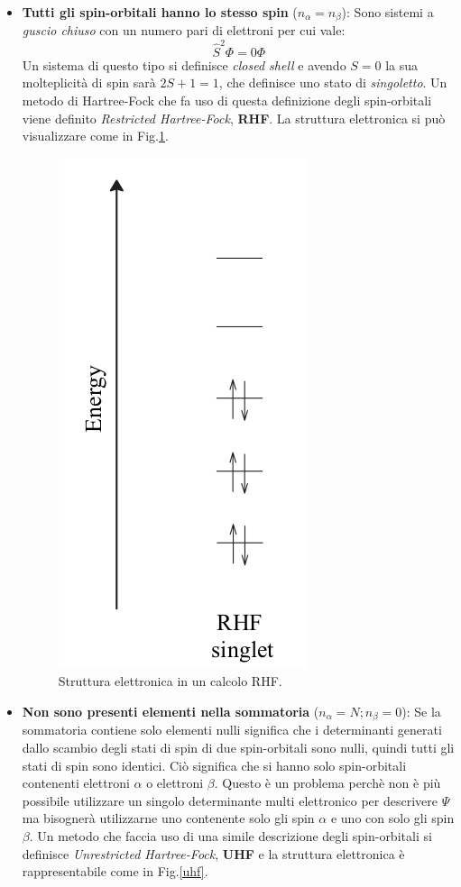 \documentclass[oneside]{amsbook}
\numberwithin{section}{chapter}
\numberwithin{equation}{section}
\numberwithin{figure}{section}
\begin{document}
\begin{itemize}
\item \textbf{Tutti gli spin-orbitali hanno lo stesso spin} ($n_{\alpha}=n_{\beta}$): Sono sistemi a \emph{guscio chiuso} con un numero pari di elettroni per cui vale: $$\hat{S}^2\Phi=0\Phi $$ Un sistema di questo tipo si definisce \emph{closed shell} e avendo $S=0$ la sua molteplicità di spin sarà $2S+1=1$, che definisce uno stato di \emph{singoletto}. Un metodo di Hartree-Fock che fa uso di questa definizione degli spin-orbitali viene definito \emph{Restricted Hartree-Fock}, \textbf{RHF}. La struttura elettronica si può visualizzare come in Fig.\ref{Rhf}.

\begin{figure}[H]
\centering
\caption{Struttura elettronica in un calcolo RHF.}\label{Rhf}
\includegraphics[scale=0.25]{rhf}
\end{figure}

\item \textbf{Non sono presenti elementi nella sommatoria} ($n_{\alpha}=N; n_{\beta}=0$): Se  la sommatoria contiene solo elementi nulli significa che i determinanti generati dallo scambio degli stati di spin di due spin-orbitali sono nulli, quindi tutti gli stati di spin sono identici. Ciò significa che si hanno solo spin-orbitali contenenti elettroni $\alpha$ o elettroni $\beta$. Questo è un problema perchè non è più possibile utilizzare un singolo determinante multi elettronico per descrivere $\Psi$ ma bisognerà utilizzarne uno contenente solo gli spin $\alpha$ e uno con solo gli spin $\beta$. Un metodo che faccia uso di una simile descrizione degli spin-orbitali si definisce \emph{Unrestricted Hartree-Fock}, \textbf{UHF} e la struttura elettronica è rappresentabile come in Fig.\ref{uhf}.


\end{itemize}
\end{document}
